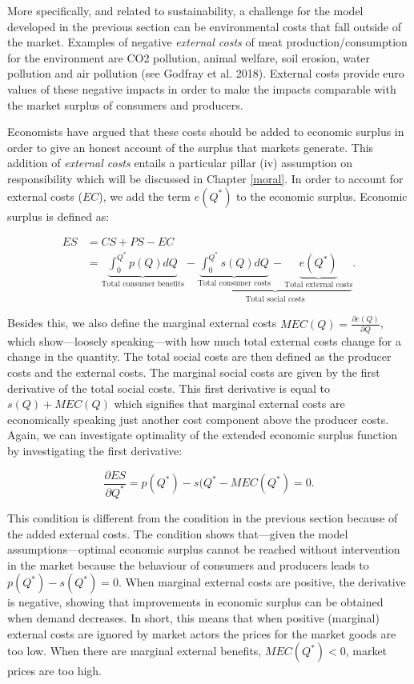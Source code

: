 \documentclass[
]{book}
\begin{document}
More specifically, and related to sustainability, a challenge for the model developed in the previous section can be environmental costs that fall outside of the market. Examples of negative \emph{external costs} of meat production/consumption for the environment are CO2 pollution, animal welfare, soil erosion, water pollution and air pollution (see Godfray et al. 2018). External costs provide euro values of these negative impacts in order to make the impacts comparable with the market surplus of consumers and producers.

Economists have argued that these costs should be added to economic surplus in order to give an honest account of the surplus that markets generate. This addition of \emph{external costs} entails a particular pillar (iv) assumption on responsibility which will be discussed in Chapter \ref{moral}. In order to account for external costs (\(EC\)), we add the term \(e(Q^\ast)\) to the economic surplus. Economic surplus is defined as:

\begin{align}
ES &= CS + PS - EC \\
&= \underbrace{\int_0^{Q^\ast} p(Q)dQ}_\text{Total consumer benefits} - \underbrace{\underbrace{\int^{Q^\ast}_0 s(Q)dQ}_\text{Total consumer costs} - \underbrace{e(Q^\ast)}_\text{Total external costs}}_\text{Total social costs}.
\end{align}

Besides this, we also define the marginal external costs \(MEC(Q)=\frac{\partial e(Q)}{\partial Q}\), which show---loosely speaking---with how much total external costs change for a change in the quantity. The total social costs are then defined as the producer costs and the external costs. The marginal social costs are given by the first derivative of the total social costs. This first derivative is equal to \(s(Q)+MEC(Q)\) which signifies that marginal external costs are economically speaking just another cost component above the producer costs. Again, we can investigate optimality of the extended economic surplus function by investigating the first derivative:

\begin{equation}
\frac{\partial ES}{\partial Q^\ast} = p(Q^\ast) - s(Q^\ast - MEC(Q^\ast) = 0.
\end{equation}

This condition is different from the condition in the previous section because of the added external costs. The condition shows that---given the model assumptions---optimal economic surplus cannot be reached without intervention in the market because the behaviour of consumers and producers leads to \(p(Q^\ast)-s(Q^\ast)=0\). When marginal external costs are positive, the derivative is negative, showing that improvements in economic surplus can be obtained when demand decreases. In short, this means that when positive (marginal) external costs are ignored by market actors the prices for the market goods are too low. When there are marginal external benefits, \(MEC(Q^\ast )<0\), market prices are too high.
\end{document}
